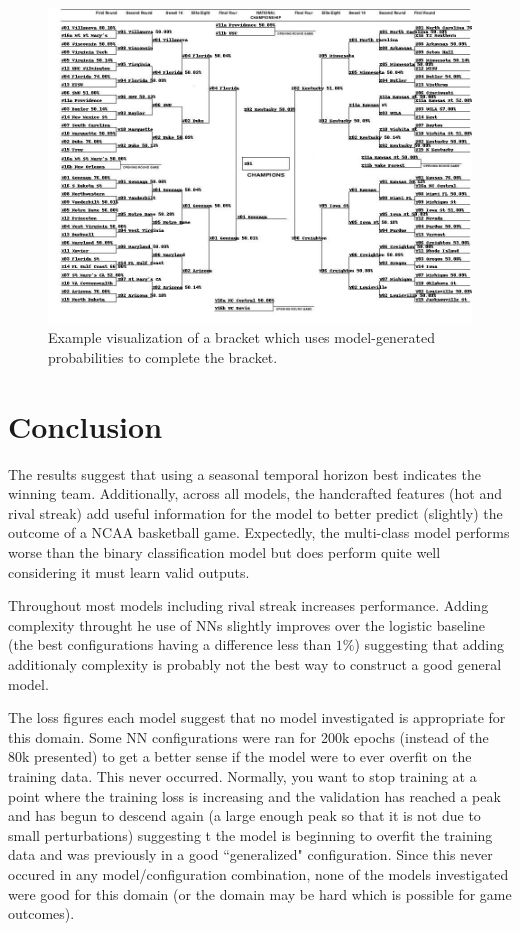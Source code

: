 \documentclass{article} %
\begin{document}
\begin{figure}[!htb]
  \includegraphics[width=\linewidth]{figures/predicted-bracket.jpg}
  \caption{Example visualization of a bracket which uses model-generated probabilities to complete the bracket.}
  \label{fig:bracket-visual}
\end{figure}


\section{Conclusion}
\label{sec:conclusion}

The results suggest that using a seasonal temporal horizon best indicates the winning team.
Additionally, across all models, the handcrafted features (hot and rival streak) add useful information for the model to better predict (slightly) the outcome of a NCAA basketball game.
Expectedly, the multi-class model performs worse than the binary classification model but does perform quite well considering it must learn valid outputs.

Throughout most models including rival streak increases performance.
Adding complexity throught he use of NNs slightly improves over the logistic baseline (the best configurations having a difference less than $1\%$) suggesting that adding additionaly complexity is probably not the best way to construct a good general model.

The loss figures each model suggest that no model investigated is appropriate for this domain.
Some NN configurations were ran for 200k epochs (instead of the 80k presented) to get a better sense if the model were to ever overfit on the training data.
This never occurred.
Normally, you want to stop training at a point where the training loss is increasing and the validation has reached a peak and has begun to descend again (a large enough peak so that it is not due to small perturbations) suggesting t the model is beginning to overfit the training data and was previously in a good ``generalized" configuration.
Since this never occured in any model/configuration combination, none of the models investigated were good for this domain (or the domain may be hard which is possible for game outcomes).
\end{document}
